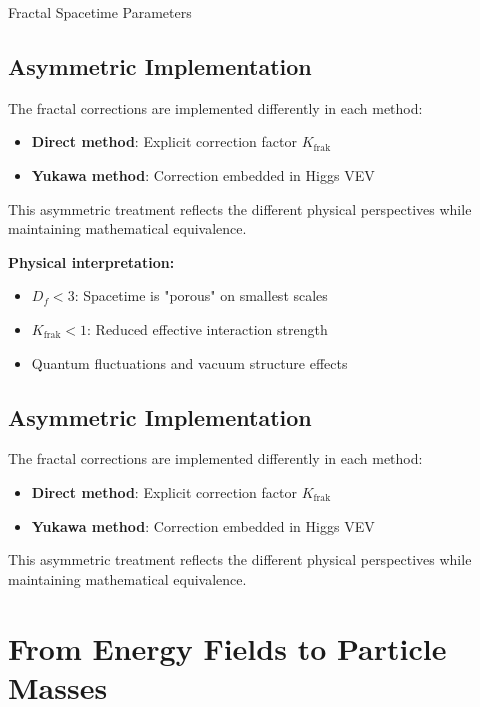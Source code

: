 \documentclass[12pt,a4paper]{article}
\begin{document}
\begin{fractal}{Fractal Spacetime Parameters}{}
	\subsection{Asymmetric Implementation}
	\label{subsec:asymmetric_implementation}
	
	The fractal corrections are implemented differently in each method:
	\begin{itemize}
		\item \textbf{Direct method}: Explicit correction factor $K_{\text{frak}}$
		\item \textbf{Yukawa method}: Correction embedded in Higgs VEV
	\end{itemize}
	
	This asymmetric treatment reflects the different physical perspectives while maintaining mathematical equivalence.
	\begin{flushright}
		
	\end{flushright}	
		\textbf{Physical interpretation:}
		\begin{itemize}
			\item $D_f < 3$: Spacetime is "porous" on smallest scales
			\item $K_{\text{frak}} < 1$: Reduced effective interaction strength
			\item Quantum fluctuations and vacuum structure effects
		\end{itemize}
	\end{fractal}
	
	\subsection{Asymmetric Implementation}
	\label{subsec:asymmetric_implementation}
	
	The fractal corrections are implemented differently in each method:
	\begin{itemize}
		\item \textbf{Direct method}: Explicit correction factor $K_{\text{frak}}$
		\item \textbf{Yukawa method}: Correction embedded in Higgs VEV
	\end{itemize}
	
	This asymmetric treatment reflects the different physical perspectives while maintaining mathematical equivalence.
	
	\section{From Energy Fields to Particle Masses}
	\label{sec:energy_fields_to_masses}
	
\end{document}

